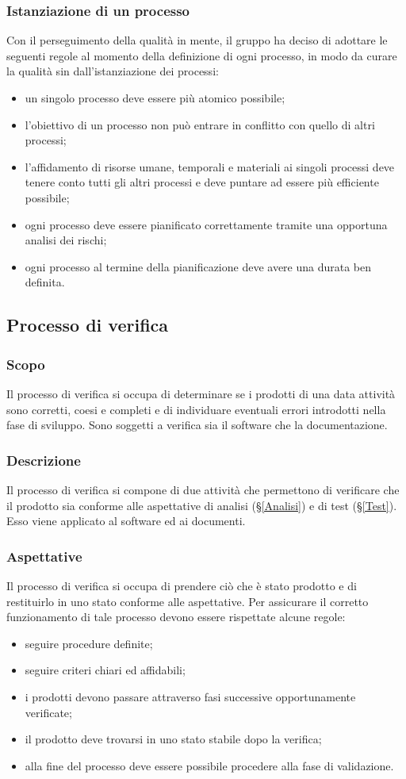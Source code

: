 \subsubsection{Istanziazione di un processo}
Con il perseguimento della qualità in mente, il gruppo \textit{\Gruppo{}} ha deciso di adottare le seguenti regole al momento della definizione di ogni processo, in modo da curare la qualità sin dall'istanziazione dei processi:
\begin{itemize}
	\item un singolo processo deve essere più atomico possibile;
	\item l'obiettivo di un processo non può entrare in conflitto con quello di altri processi;
	\item l'affidamento di risorse umane, temporali e materiali ai singoli processi deve tenere conto tutti gli altri processi e deve puntare ad essere più efficiente possibile;
	\item ogni processo deve essere pianificato correttamente tramite una opportuna analisi dei rischi;
	\item ogni processo al termine della pianificazione deve avere una durata ben definita.
\end{itemize}
\subsection{Processo di verifica}
\subsubsection{Scopo}
Il processo di verifica si occupa di determinare se i prodotti di una data attività sono corretti, coesi e completi e di individuare eventuali errori introdotti nella fase di sviluppo. Sono soggetti a verifica sia il software che la documentazione.
\subsubsection{Descrizione}
Il processo di verifica si compone di due attività che permettono di verificare che il prodotto sia conforme alle aspettative di analisi (\S{}\ref{Analisi}) e di test (\S{}\ref{Test}). Esso viene applicato al software ed ai documenti.
\subsubsection{Aspettative}
Il processo di verifica si occupa di prendere ciò che è stato prodotto e di restituirlo in uno stato conforme alle aspettative. Per assicurare il corretto funzionamento di tale processo devono essere rispettate alcune regole:
\begin{itemize}
	\item seguire procedure definite;
	\item seguire criteri chiari ed affidabili;
	\item i prodotti devono passare attraverso fasi successive opportunamente verificate;
	\item il prodotto deve trovarsi in uno stato stabile dopo la verifica;
	\item alla fine del processo deve essere possibile procedere alla fase di validazione.
\end{itemize}
